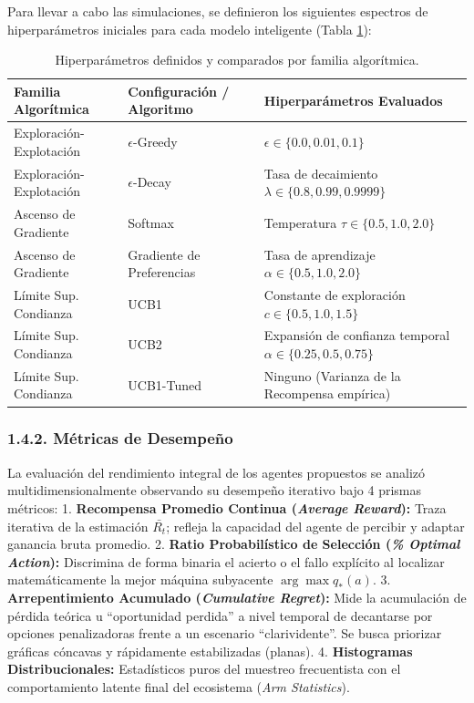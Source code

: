 Para llevar a cabo las simulaciones, se definieron los siguientes
espectros de hiperparámetros iniciales para cada modelo inteligente
(Tabla \ref{tab:Parametros}):

\begin{table}[t]
\centering
\caption{Hiperparámetros definidos y comparados por familia algorítmica.}
\label{tab:Parametros}
\begin{tabular}{|l|l|l|}
\hline
\textbf{Familia Algorítmica} & \textbf{Configuración / Algoritmo} & \textbf{Hiperparámetros Evaluados} \\ \hline
Exploración-Explotación & $\epsilon$-Greedy & $\epsilon \in \{0.0, 0.01, 0.1\}$ \\ \hline
Exploración-Explotación & $\epsilon$-Decay & Tasa de decaimiento $\lambda \in \{0.8, 0.99, 0.9999\}$ \\ \hline
Ascenso de Gradiente & Softmax & Temperatura $\tau \in \{0.5, 1.0, 2.0\}$ \\ \hline
Ascenso de Gradiente & Gradiente de Preferencias & Tasa de aprendizaje $\alpha \in \{0.5, 1.0, 2.0\}$ \\ \hline
Límite Sup. Condianza & UCB1 & Constante de exploración $c \in \{0.5, 1.0, 1.5\}$ \\ \hline
Límite Sup. Condianza & UCB2 & Expansión de confianza temporal $\alpha \in \{0.25, 0.5, 0.75\}$ \\ \hline
Límite Sup. Condianza & UCB1-Tuned & Ninguno (Varianza de la Recompensa empírica) \\ \hline
\end{tabular}
\end{table}

\subsubsection{1.4.2. Métricas de
Desempeño}\label{muxe9tricas-de-desempeuxf1o}

La evaluación del rendimiento integral de los agentes propuestos se
analizó multidimensionalmente observando su desempeño iterativo bajo 4
prismas métricos: 1. \textbf{Recompensa Promedio Continua (\emph{Average
Reward}):} Traza iterativa de la estimación \(\bar{R_t}\); refleja la
capacidad del agente de percibir y adaptar ganancia bruta promedio. 2.
\textbf{Ratio Probabilístico de Selección (\emph{\% Optimal Action}):}
Discrimina de forma binaria el acierto o el fallo explícito al localizar
matemáticamente la mejor máquina subyacente \(\arg\max q_*(a)\). 3.
\textbf{Arrepentimiento Acumulado (\emph{Cumulative Regret}):} Mide la
acumulación de pérdida teórica u ``oportunidad perdida'' a nivel
temporal de decantarse por opciones penalizadoras frente a un escenario
``clarividente''. Se busca priorizar gráficas cóncavas y rápidamente
estabilizadas (planas). 4. \textbf{Histogramas Distribucionales:}
Estadísticos puros del muestreo frecuentista con el comportamiento
latente final del ecosistema (\emph{Arm Statistics}).

